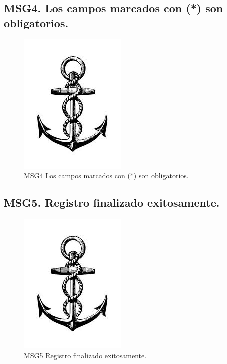 \subsection{MSG4. Los campos marcados con (*) son obligatorios.}
    \begin{figure}[htbp]
        \begin{center}
            \includegraphics[width=.4\textwidth]{images/MSG/ancla}
            \caption{MSG4 Los campos marcados con (*) son obligatorios.}
            \label{fig:MSG4}
        \end{center}
    \end{figure}

\subsection{MSG5. Registro finalizado exitosamente.}
    \begin{figure}[htbp]
        \begin{center}
            \includegraphics[width=.4\textwidth]{images/MSG/ancla}
            \caption{MSG5 Registro finalizado exitosamente.}
            \label{fig:MSG5}
        \end{center}
    \end{figure}

